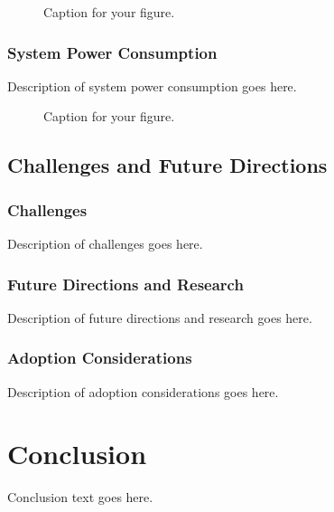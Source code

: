 \documentclass[12pt]{article}
\begin{document}
\begin{figure}[htbp]
    \centering
    \caption{Caption for your figure.}
    \label{fig:packet-analysis}
\end{figure}

\subsubsection{System Power Consumption}

Description of system power consumption goes here.

\begin{figure}[htbp]
    \centering
    \caption{Caption for your figure.}
    \label{fig:battery-voltage}
\end{figure}

\subsection{Challenges and Future Directions}

\subsubsection{Challenges}

Description of challenges goes here.

\subsubsection{Future Directions and Research}

Description of future directions and research goes here.

\subsubsection{Adoption Considerations}

Description of adoption considerations goes here.

\section{Conclusion}

Conclusion text goes here.

\clearpage
\printbibliography[heading=bibintoc, title={References}]
\clearpage
\appendix
\end{document}
